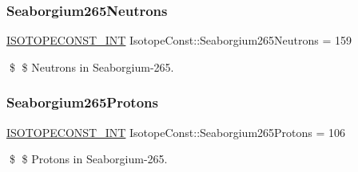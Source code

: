\subsubsection{\texorpdfstring{Seaborgium265\+Neutrons}{Seaborgium265Neutrons}}
{\footnotesize\ttfamily \mbox{\hyperlink{group___isotope_const-_macros_ga5f18360b3e99483a35c32d789e62621c}{I\+S\+O\+T\+O\+P\+E\+C\+O\+N\+S\+T\+\_\+\+I\+NT}} Isotope\+Const\+::\+Seaborgium265\+Neutrons = 159}

\$ \$ Neutrons in Seaborgium-\/265. \mbox{\label{group___isotope_const-_seaborgium-_sg265_ga643ba38505087aab8a070d0a57505f8c}} 
\subsubsection{\texorpdfstring{Seaborgium265\+Protons}{Seaborgium265Protons}}
{\footnotesize\ttfamily \mbox{\hyperlink{group___isotope_const-_macros_ga5f18360b3e99483a35c32d789e62621c}{I\+S\+O\+T\+O\+P\+E\+C\+O\+N\+S\+T\+\_\+\+I\+NT}} Isotope\+Const\+::\+Seaborgium265\+Protons = 106}

\$ \$ Protons in Seaborgium-\/265. 
